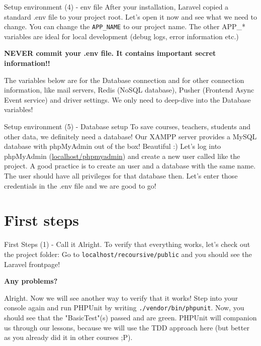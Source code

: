 \begin{frame}{Setup environment (4) - env file}
	After your installation, Laravel copied a standard .env file to your project root. Let's open it now and see what we need to change. \pause
	You can change the \texttt{APP\_NAME} to our project name. The other APP\_* variables are ideal for local development (debug logs, error information etc.)\pause
	
	\textbf{NEVER commit your .env file. It contains important secret information!!} \pause
	
	The variables below are for the Database connection and for other connection information, like mail servers, Redis (NoSQL database), Pusher (Frontend Async Event service) and driver settings. We only need to deep-dive into the Database variables!
\end{frame}

\begin{frame}{Setup environment (5) - Database setup}
	To save courses, teachers, students and other data, we definitely need a database! Our XAMPP server provides a MySQL database with phpMyAdmin out of the box! Beautiful :) \pause
	Let's log into phpMyAdmin (\url{localhost/phpmyadmin}) and create a new user called like the project. A good practice is to create an user and a database with the same name. The user should have all privileges for that database then. Let's enter those credentials in the .env file and we are good to go!
\end{frame}


\section{First steps}

\begin{frame}{First Steps (1) - Call it}
	Alright. To verify that everything works, let's check out the project folder: Go to \texttt{localhost/recoursive/public} and you should see the Laravel frontpage! \pause
	
	\textbf{Any problems?} \pause
	
	Alright. Now we will see another way to verify that it works! Step into your console again and run PHPUnit by writing \texttt{./vendor/bin/phpunit}. \pause
	Now, you should see that the "BasicTest"(s) passed and are green. \pause
	PHPUnit will companion us through our lessons, because we will use the TDD approach here (but better as you already did it in other courses ;P).
\end{frame}

